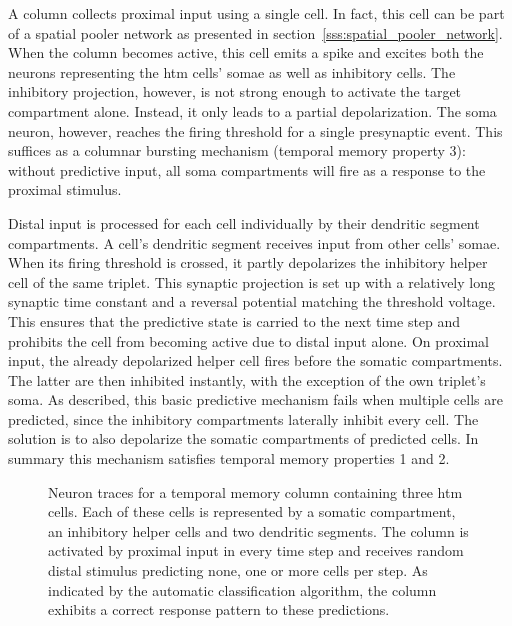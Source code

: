 A column collects proximal input using a single cell. In fact, this cell can be
part of a spatial pooler network as presented in
section~\ref{sss:spatial_pooler_network}. When the column becomes active, this
cell emits a spike and excites both the neurons representing the \gls{htm}
cells' somae as well as inhibitory cells. The inhibitory projection, however, is
not strong enough to activate the target compartment alone. Instead, it only
leads to a partial depolarization. The soma neuron, however, reaches the firing
threshold for a single presynaptic event. This suffices as a columnar bursting
mechanism (temporal memory property 3): without predictive input, all soma
compartments will fire as a response to the proximal stimulus.

Distal input is processed for each cell individually by their dendritic segment
compartments. A cell's dendritic segment receives input from other cells' somae.
When its firing threshold is crossed, it partly depolarizes the inhibitory
helper cell of the same triplet. This synaptic projection is set up with a
relatively long synaptic time constant and a reversal potential matching the
threshold voltage. This ensures that the predictive state is carried to the next
time step and prohibits the cell from becoming active due to distal input alone.
On proximal input, the already depolarized helper cell fires before the somatic
compartments. The latter are then inhibited instantly, with the exception of the
own triplet's soma. As described, this basic predictive mechanism fails when
multiple cells are predicted, since the inhibitory compartments laterally
inhibit every cell. The solution is to also depolarize the somatic
compartments of predicted cells. In summary this mechanism satisfies temporal
memory properties 1 and 2.

\begin{figure}[p]
	\begin{center}
		
	\end{center}
	\caption{Neuron traces for a temporal memory column containing three \gls{htm} cells. Each of these cells is represented by a somatic compartment, an inhibitory helper cells and two dendritic segments. The column is activated by proximal input in every time step and receives random distal stimulus predicting none, one or more cells per step. As indicated by the automatic classification algorithm, the column exhibits a correct response pattern to these predictions.}
	\label{fig:static_temporal_memory_traces}
\end{figure}
